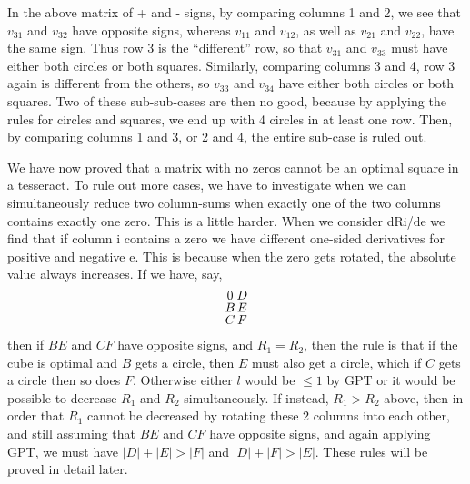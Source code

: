 In the above matrix of + and - signs, by comparing columns 1 and 2,
we see that $v_{31}$ and $v_{32}$ have opposite signs, whereas $v_{11}$ and
$v_{12}$, as well as $v_{21}$ and $v_{22}$, have the same sign. Thus row 3
is the ``different'' row, so that $v_{31}$ and $v_{33}$ must have either both
\label{refpage24}
circles or both squares.  Similarly, comparing columns 3 and 4, row 3 again
is different from the others, so $v_{33}$ and $v_{34}$ have either both
circles or both squares.  Two of these sub-sub-cases are then no good, because
by applying the rules for circles and squares, we end up with 4 circles in at
least one row. Then, by comparing columns 1 and 3, or 2 and 4, the entire
\label{refpage16}
sub-case is ruled out.

We have now proved that a matrix with no zeros cannot be an
\label{refpage27}
optimal square in a tesseract. To rule out more cases, we have to
investigate when we can simultaneously reduce two column-sums when
exactly one of the two columns contains exactly one zero. This is a little
harder. When we consider dRi/de we find that if column i contains a zero
we have different one-sided derivatives for positive and negative e. This
is because when the zero gets rotated, the absolute value always
increases. If we have, say,
\begin{equation*}
\myarrset
\begin{array}{cc}
0 & D \\
B & E \\
C & F
\end{array}
\end{equation*}
then if $BE$ and $CF$ have opposite signs, and $R_1 = R_2$, then the rule is
that if the cube is optimal and $B$ gets a circle, then $E$ must also get a
circle, which if $C$ gets a circle then so does $F$.  Otherwise either $l$
would be $\leq 1$ by GPT or it would be possible to decrease $R_1$ and $R_2$
simultaneously.  If instead, $R_1 > R_2$ above, then in order that $R_1$
cannot be decreased by rotating these 2 columns into each other, and still
assuming that $BE$ and $CF$ have opposite signs, and again applying GPT, we
must have $|D| + |E| > |F|$ and $|D| + |F| > |E|$.  These rules will be proved
in detail later.

